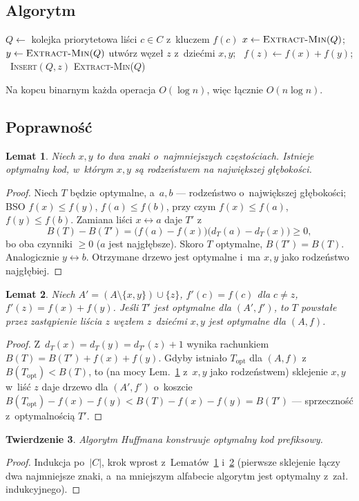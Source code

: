 \documentclass[11pt,a4paper]{article}
\theoremstyle{plain}
\newtheorem{twierdzenie}{Twierdzenie}[section]
\newtheorem{lemat}[twierdzenie]{Lemat}
\theoremstyle{definition}
\begin{document}
\subsection*{Algorytm}
\begin{algorithm}[H]
\caption{Huffman($C,f$)}
\begin{algorithmic}[1]
\State $Q\gets$ kolejka priorytetowa liści $c\in C$ z~kluczem $f(c)$
  \State $x\gets\textsc{Extract-Min}(Q)$; \ $y\gets\textsc{Extract-Min}(Q)$
  \State utwórz węzeł $z$ z~dziećmi $x,y$; \ $f(z)\gets f(x)+f(y)$; \ \textsc{Insert}$(Q,z)$
\EndFor
\State \Return \textsc{Extract-Min}($Q$) 
\end{algorithmic}
\end{algorithm}
Na kopcu binarnym każda operacja $O(\log n)$, więc łącznie $O(n\log n)$.

\subsection*{Poprawność}
\begin{lemat}\label{lem:huff1}
Niech $x,y$ to dwa znaki o~najmniejszych częstościach. Istnieje optymalny kod, w~którym $x,y$ są
rodzeństwem na największej głębokości.
\end{lemat}
\begin{proof}
Niech $T$ będzie optymalne, a~$a,b$ --- rodzeństwo o~największej głębokości; BSO $f(x)\le f(y)$,
$f(a)\le f(b)$, przy czym $f(x)\le f(a)$, $f(y)\le f(b)$. Zamiana liści $x\leftrightarrow a$ daje $T'$ z~
\[
B(T)-B(T')=\big(f(a)-f(x)\big)\big(d_T(a)-d_T(x)\big)\ge0,
\]
bo oba czynniki $\ge0$ ($a$ jest najgłębsze). Skoro $T$ optymalne, $B(T')=B(T)$. Analogicznie
$y\leftrightarrow b$. Otrzymane drzewo jest optymalne i~ma $x,y$ jako rodzeństwo najgłębiej.
\end{proof}
\begin{lemat}\label{lem:huff2}
Niech $A'=(A\setminus\{x,y\})\cup\{z\}$, $f'(c)=f(c)$ dla $c\ne z$, $f'(z)=f(x)+f(y)$. Jeśli $T'$ jest
optymalne dla $(A',f')$, to $T$ powstałe przez zastąpienie liścia $z$ węzłem z~dziećmi $x,y$ jest
optymalne dla $(A,f)$.
\end{lemat}
\begin{proof}
Z~$d_T(x)=d_T(y)=d_{T'}(z)+1$ wynika rachunkiem $B(T)=B(T')+f(x)+f(y)$. Gdyby istniało $T_{\mathrm{opt}}$ dla
$(A,f)$ z~$B(T_{\mathrm{opt}})<B(T)$, to (na mocy Lem.~\ref{lem:huff1} z~$x,y$ jako rodzeństwem) sklejenie
$x,y$ w~liść $z$ daje drzewo dla $(A',f')$ o~koszcie $B(T_{\mathrm{opt}})-f(x)-f(y)<B(T)-f(x)-f(y)=B(T')$
--- sprzeczność z~optymalnością $T'$.
\end{proof}
\begin{twierdzenie}
Algorytm Huffmana konstruuje optymalny kod prefiksowy.
\end{twierdzenie}
\begin{proof}
Indukcja po~$|C|$, krok wprost z~Lematów~\ref{lem:huff1} i~\ref{lem:huff2} (pierwsze sklejenie łączy dwa
najmniejsze znaki, a~na mniejszym alfabecie algorytm jest optymalny z~zał. indukcyjnego).
\end{proof}
\end{document}
